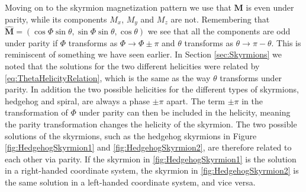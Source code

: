 Moving on to the skyrmion magnetization pattern we use that $\mathbold{M}$ is even under parity, while its components $M_x$, $M_y$ and $M_z$ are not. Remembering that $\mathbold{\hat{M}} = \left(\cos\Phi\sin\theta, \sin\Phi\sin\theta, \cos\theta\right)$ we see that all the components are odd under parity if $\Phi$ transforms as $\Phi \rightarrow \Phi \pm \pi$ and $\theta$ transforms as $\theta\rightarrow\pi-\theta$. This is reminiscent of something we have seen earlier. In Section \ref{sec:Skyrmions} we noted that the solutions for the two different helicities were related by \eqref{eq:ThetaHelicityRelation}, which is the same as the way $\theta$ transforms under parity. In addition the two possible helicities for the different types of skyrmions, hedgehog and spiral, are always a phase $\pm\pi$ apart. The term $\pm\pi$ in the transformation of $\Phi$ under parity can then be included in the helicity, meaning the parity transformation changes the helicity of the skyrmion. The two possible solutions of the skyrmions, such as the hedgehog skyrmions in Figure \ref{fig:HedgehogSkyrmion1} and \ref{fig:HedgehogSkyrmion2}, are therefore related to each other via parity. If the skyrmion in \ref{fig:HedgehogSkyrmion1} is the solution in a right-handed coordinate system, the skyrmion in \ref{fig:HedgehogSkyrmion2} is the same solution in a left-handed coordinate system, and vice versa.
